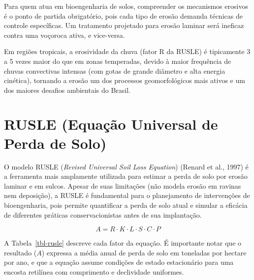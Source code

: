 \documentclass[
  portuguese,
  11pt,
  a4paper,
  open=any]{scrbook}
\begin{document}
Para quem atua em bioengenharia de solos, compreender os mecanismos
erosivos é o ponto de partida obrigatório, pois cada tipo de erosão
demanda técnicas de controle específicas. Um tratamento projetado para
erosão laminar será ineficaz contra uma voçoroca ativa, e vice-versa.

Em regiões tropicais, a erosividade da chuva (fator R da RUSLE) é
tipicamente 3 a 5 vezes maior do que em zonas temperadas, devido à maior
frequência de chuvas convectivas intensas (com gotas de grande diâmetro
e alta energia cinética), tornando a erosão um dos processos
geomorfológicos mais ativos e um dos maiores desafios ambientais do
Brasil.

\section{RUSLE (Equação Universal de Perda de
Solo)}\label{rusle-equauxe7uxe3o-universal-de-perda-de-solo}

O modelo RUSLE (\emph{Revised Universal Soil Loss Equation}) (Renard et
al., 1997) é a ferramenta mais amplamente utilizada para estimar a perda
de solo por erosão laminar e em sulcos. Apesar de suas limitações (não
modela erosão em ravinas nem deposição), a RUSLE é fundamental para o
planejamento de intervenções de bioengenharia, pois permite quantificar
a perda de solo atual e simular a eficácia de diferentes práticas
conservacionistas antes de sua implantação.

\[
A = R \cdot K \cdot L \cdot S \cdot C \cdot P
\]

A Tabela~\ref{tbl-rusle} descreve cada fator da equação. É importante
notar que o resultado (\(A\)) expressa a média anual de perda de solo em
toneladas por hectare por ano, e que a equação assume condições de
estado estacionário para uma encosta retilínea com comprimento e
declividade uniformes.
\end{document}
